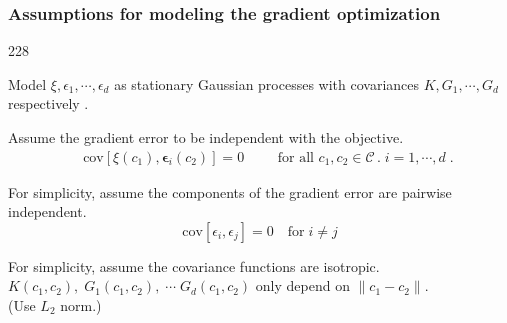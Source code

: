 \documentclass{beamer}
\let\oldcite=\cite
\renewcommand{\cite}[1]{\textcolor[rgb]{.4,.4,.85}{\oldcite{#1}}}
\newcommand{\barrow}{\item[\color{darkred}\ding{228}]}
\begin{document}
\begin{frame}
    \frametitle{Assumptions for modeling the gradient \hfill \scriptsize{optimization}}\small
    \begin{dinglist}{228}
            \barrow Model $\xi, \epsilon_1, \cdots, \epsilon_d$ as stationary 
                    Gaussian processes with covariances $K, G_1, \cdots, G_d$ respectively
                    \scriptsize \cite{Kennedy 01, Higdon 04} \small.
            \barrow Assume the gradient error to be independent with the objective.
            \begin{equation*}\left.\begin{split}
                &\textrm{cov} \left[\xi(c_1), \mathbf{\epsilon}_i(c_2) \right] = 0
            \end{split} \right.\qquad \textrm{for all } c_1, c_2 \in \mathcal{C}\,.
            \; i=1,\cdots, d\;.
            \end{equation*}
            \barrow For simplicity, assume the components of the gradient error 
                    are pairwise independent.
            $$
                \textrm{cov} \left[\epsilon_i, \epsilon_j\right] = 0 \quad \textrm{for}\; i\neq j
            $$
            \barrow For simplicity, assume the covariance functions are isotropic.\\
            $K(c_1, c_2), \; G_1(c_1, c_2),\; \cdots\; G_d(c_1, c_2)$ only depend on
            $\big\|c_1-c_2\big\|$.\\ \scriptsize
            (Use $L_2$ norm.)\small
    \end{dinglist}
\end{frame}
\end{document}
